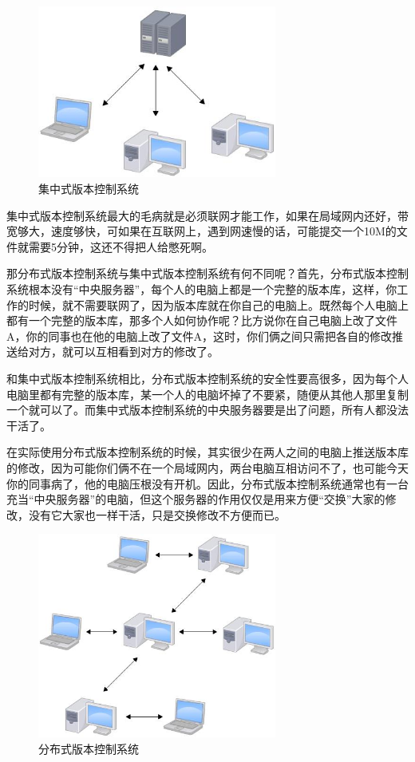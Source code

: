 \begin{figure}[h]
    \centering
    \includegraphics[width=0.7\textwidth]{img/central-repo.jpg}
    \caption{集中式版本控制系统}
    \label{fig:mesh1}
\end{figure}


集中式版本控制系统最大的毛病就是必须联网才能工作，如果在局域网内还好，带宽够大，速度够快，可如果在互联网上，遇到网速慢的话，可能提交一个10M的文件就需要5分钟，这还不得把人给憋死啊。

那分布式版本控制系统与集中式版本控制系统有何不同呢？首先，分布式版本控制系统根本没有“中央服务器”，每个人的电脑上都是一个完整的版本库，这样，你工作的时候，就不需要联网了，因为版本库就在你自己的电脑上。既然每个人电脑上都有一个完整的版本库，那多个人如何协作呢？比方说你在自己电脑上改了文件A，你的同事也在他的电脑上改了文件A，这时，你们俩之间只需把各自的修改推送给对方，就可以互相看到对方的修改了。

和集中式版本控制系统相比，分布式版本控制系统的安全性要高很多，因为每个人电脑里都有完整的版本库，某一个人的电脑坏掉了不要紧，随便从其他人那里复制一个就可以了。而集中式版本控制系统的中央服务器要是出了问题，所有人都没法干活了。

在实际使用分布式版本控制系统的时候，其实很少在两人之间的电脑上推送版本库的修改，因为可能你们俩不在一个局域网内，两台电脑互相访问不了，也可能今天你的同事病了，他的电脑压根没有开机。因此，分布式版本控制系统通常也有一台充当“中央服务器”的电脑，但这个服务器的作用仅仅是用来方便“交换”大家的修改，没有它大家也一样干活，只是交换修改不方便而已。

\begin{figure}[h]
    \centering
    \includegraphics[width=0.7\textwidth]{img/distributed-repo.jpg}
    \caption{分布式版本控制系统}
    \label{fig:mesh1}
\end{figure}

